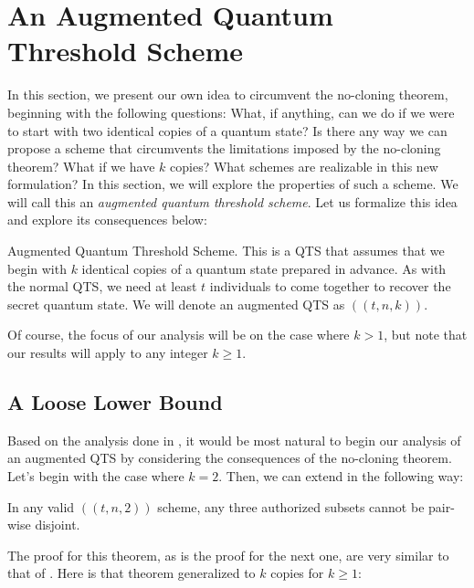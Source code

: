 \chapter{An Augmented Quantum Threshold Scheme}
\label{ch3}

In this section, we present our own idea to circumvent the no-cloning theorem, beginning with the following questions: What, if anything, can we do if we were to start with two identical copies of a quantum state? Is there any way we can propose a scheme that circumvents the limitations imposed by the no-cloning theorem? What if we have $k$ copies? What schemes are realizable in this new formulation? In this section, we will explore the properties of such a scheme. We will call this an \textit{augmented quantum threshold scheme}. Let us formalize this idea and explore its consequences below:

\theoremstyle{definition}
\begin{definition}{Augmented Quantum Threshold Scheme.}
    \label{defn:augmented-qts}
     This is a QTS that assumes that we begin with $k$ identical copies of a quantum state prepared in advance. As with the normal QTS, we need at least $t$ individuals to come together to recover the secret quantum state. We will denote an augmented QTS as $((t,n,k))$.
\end{definition}

Of course, the focus of our analysis will be on the case where $k>1$, but note that our results will apply to any integer $k \geq 1$.

\section{A Loose Lower Bound}

Based on the analysis done in , it would be most natural to begin our analysis of an augmented QTS by considering the consequences of the no-cloning theorem. Let's begin with the case where $k=2$. Then, we can extend  in the following way:

\begin{theorem}
    \label{thm:three-authorized}
    In any valid $((t,n,2))$ scheme, any three authorized subsets cannot be pair-wise disjoint.
\end{theorem}

The proof for this theorem, as is the proof for the next one, are very similar to that of . Here is that theorem generalized to $k$ copies for $k \geq 1$:

